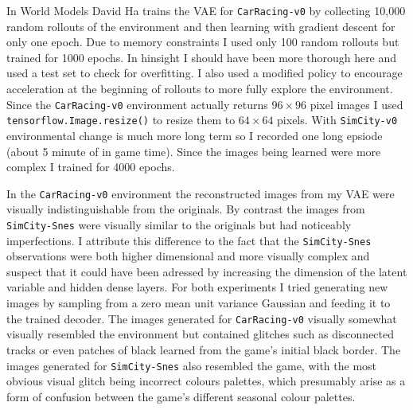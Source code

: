 \documentclass{article}
\numberwithin{figure}{section}
\theoremstyle{definition}
\begin{document}
In World Models David Ha trains the VAE for \texttt{CarRacing-v0} by collecting 10,000 random rollouts of the environment and then learning with gradient descent for only one epoch.
Due to memory constraints I used only 100 random rollouts but trained for 1000 epochs.
In hinsight I should have been more thorough here and used a test set to check for overfitting.
I also used a modified policy to encourage acceleration at the beginning of rollouts to more fully explore the environment.
Since the \texttt{CarRacing-v0} environment actually returns $96 \times 96$ pixel images I used \texttt{tensorflow.Image.resize()} to resize them to $64 \times 64$ pixels.
With \texttt{SimCity-v0} environmental change is much more long term so I recorded one long epsiode (about 5 minute of in game time).
Since the images being learned were more complex I trained for 4000 epochs.



In the \texttt{CarRacing-v0} environment the reconstructed images from my VAE were visually indistinguishable from the originals.
By contrast the images from \texttt{SimCity-Snes} were visually similar to the originals but had noticeably imperfections.
I attribute this difference to the fact that the \texttt{SimCity-Snes} observations were both higher dimensional and more visually complex and suspect that it could have been adressed by increasing the dimension of the latent variable and hidden dense layers.
For both experiments I tried generating new images by sampling from a zero mean unit variance Gaussian and feeding it to the trained decoder.
The images generated for \texttt{CarRacing-v0} visually somewhat visually resembled the environment but contained glitches such as disconnected tracks or even patches of black learned from the game's initial black border.
The images generated for \texttt{SimCity-Snes} also resembled the game, with the most obvious visual glitch being incorrect colours palettes, which presumably arise as a form of confusion between the game's different seasonal colour palettes.
\end{document}
